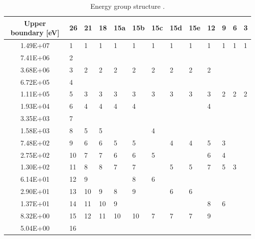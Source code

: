 \begin{table}[htbp!]
  \centering
  \caption{Energy group structure \cite{iaea_evaluation_2003}.}
  \begin{tabular}{c|llllllllllll}
  \toprule
  Upper boundary [eV] & 26    & 21   & 18   & 15a & 15b & 15c & 15d & 15e   & 12  & 9  & 6  & 3 \\
  \midrule
  1.49E+07            & 1     & 1    & 1    & 1   & 1   & 1   & 1   & 1     & 1   & 1  & 1  & 1 \\ 
  7.41E+06            & 2     &      &      &     &     &     &     &       &     &    &    &   \\ 
  3.68E+06            & 3     & 2    & 2    & 2   & 2   & 2   & 2   & 2     & 2   &    &    &   \\ 
  6.72E+05            & 4     &      &      &     &     &     &     &       &     &    &    &   \\ 
  1.11E+05            & 5     & 3    & 3    & 3   & 3   & 3   & 3   & 3     & 3   & 2  & 2  & 2 \\ 
  1.93E+04            & 6     & 4    & 4    & 4   & 4   &     &     &       & 4   &    &    &   \\ 
  3.35E+03            & 7     &      &      &     &     &     &     &       &     &    &    &   \\ 
  1.58E+03            & 8     & 5    & 5    &     &     & 4   &     &       &     &    &    &   \\ 
  7.48E+02            & 9     & 6    & 6    & 5   & 5   &     & 4   & 4     & 5   & 3  &    &   \\ 
  2.75E+02            & 10    & 7    & 7    & 6   & 6   & 5   &     &       & 6   & 4  &    &   \\ 
  1.30E+02            & 11    & 8    & 8    & 7   & 7   &     & 5   & 5     & 7   & 5  & 3  &   \\ 
  6.14E+01            & 12    & 9    &      &     & 8   & 6   &     &       &     &    &    &   \\ 
  2.90E+01            & 13    & 10   & 9    & 8   & 9   &     & 6   & 6     &     &    &    &   \\ 
  1.37E+01            & 14    & 11   & 10   & 9   &     &     &     &       & 8   & 6  &    &   \\ 
  8.32E+00            & 15    & 12   & 11   & 10  & 10  & 7   & 7   & 7     & 9   &    &    &   \\ 
  5.04E+00            & 16    &      &      &     &     &     &     &       &     &    &    &   \\ 

\end{tabular}
\end{table}
